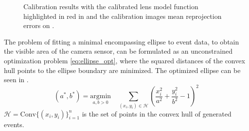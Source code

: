 \begin{figure}[H]
	\centering
	\caption{
		Calibration results with the calibrated lens model function highlighted in red in  and the calibration images mean reprojection errors on .
  }
	\label{fig:calib_r}
\end{figure}

The problem of fitting a minimal encompassing ellipse to event data, to obtain the visible area of the camera sensor, can be formulated
as an unconstrained optimization problem \ref{eq:ellipse_opt}, where the squared distances of the convex hull points to the ellipse boundary are minimized.
The optimized ellipse can be seen in .
\begin{equation}
(a^*, b^*) = \underset{a, b > 0}{\text{argmin}} \quad \sum_{(x_i,y_i) \in \mathcal{H}} \left( \frac{x_i^2}{a^2} + \frac{y_i^2}{b^2} - 1 \right)^2
\label{eq:ellipse_opt}
\end{equation}
 $\mathcal{H} = \text{Conv}\{(x_i,y_i)\}_{i=1}^n$ is the set of points in the convex hull of generated events.

